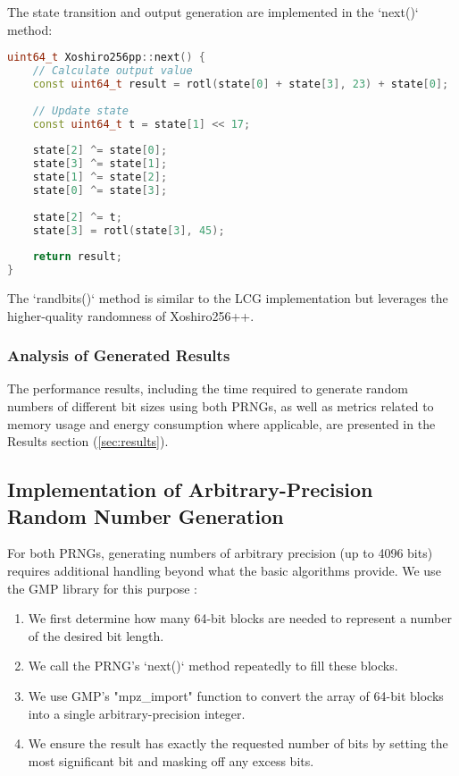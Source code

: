 The state transition and output generation are implemented in the `next()` method:

\begin{lstlisting}[language=C++, caption=Xoshiro256++ Implementation (Core Function)]
uint64_t Xoshiro256pp::next() {
    // Calculate output value
    const uint64_t result = rotl(state[0] + state[3], 23) + state[0];
    
    // Update state
    const uint64_t t = state[1] << 17;
    
    state[2] ^= state[0];
    state[3] ^= state[1];
    state[1] ^= state[2];
    state[0] ^= state[3];
    
    state[2] ^= t;
    state[3] = rotl(state[3], 45);
    
    return result;
}
\end{lstlisting}

The `randbits()` method is similar to the LCG implementation but leverages the higher-quality randomness of Xoshiro256++.

\subsubsection{Analysis of Generated Results}

The performance results, including the time required to generate random numbers of different bit sizes using both PRNGs, as well as metrics related to memory usage and energy consumption where applicable, are presented in the Results section (\autoref{sec:results}).

\subsection{Implementation of Arbitrary-Precision Random Number Generation}

For both PRNGs, generating numbers of arbitrary precision (up to 4096 bits) requires additional handling beyond what the basic algorithms provide. We use the GMP library for this purpose \cite{granlund2012}:

\begin{enumerate}
    \item We first determine how many 64-bit blocks are needed to represent a number of the desired bit length.
    
    \item We call the PRNG's `next()` method repeatedly to fill these blocks.
    
    \item We use GMP's "mpz\_import" function to convert the array of 64-bit blocks into a single arbitrary-precision integer.
    
    \item We ensure the result has exactly the requested number of bits by setting the most significant bit and masking off any excess bits.
\end{enumerate}

